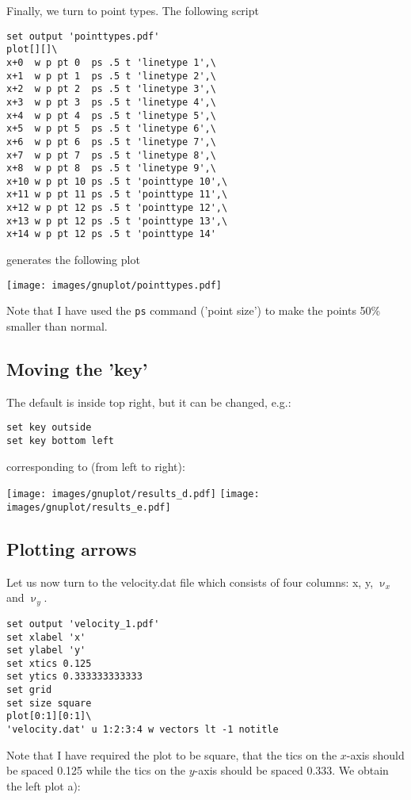 Finally, we turn to point types.
The following script
\begin{verbatim}
set output 'pointtypes.pdf'
plot[][]\
x+0  w p pt 0  ps .5 t 'linetype 1',\
x+1  w p pt 1  ps .5 t 'linetype 2',\
x+2  w p pt 2  ps .5 t 'linetype 3',\
x+3  w p pt 3  ps .5 t 'linetype 4',\
x+4  w p pt 4  ps .5 t 'linetype 5',\
x+5  w p pt 5  ps .5 t 'linetype 6',\
x+6  w p pt 6  ps .5 t 'linetype 7',\
x+7  w p pt 7  ps .5 t 'linetype 8',\
x+8  w p pt 8  ps .5 t 'linetype 9',\
x+10 w p pt 10 ps .5 t 'pointtype 10',\
x+11 w p pt 11 ps .5 t 'pointtype 11',\
x+12 w p pt 12 ps .5 t 'pointtype 12',\
x+13 w p pt 12 ps .5 t 'pointtype 13',\
x+14 w p pt 12 ps .5 t 'pointtype 14' 
\end{verbatim}
generates the following plot
\begin{center}
\texttt{[image: images/gnuplot/pointtypes.pdf]}
\end{center}
Note that I have used the {\tt ps} command ('point size') to make the points 50\% smaller 
than normal. 


\subsection*{Moving the 'key'}

The default is inside top right, but it can be changed, e.g.:
\begin{verbatim}
set key outside
set key bottom left
\end{verbatim}
corresponding to (from left to right):
\begin{center}
\texttt{[image: images/gnuplot/results\_d.pdf]}
\texttt{[image: images/gnuplot/results\_e.pdf]}
\end{center}

\subsection*{Plotting arrows}

Let us now turn to the {\filenamefont velocity.dat} file which consists of 
four columns: x, y, $\upnu_x$ and $\upnu_y$.

\begin{verbatim}
set output 'velocity_1.pdf'
set xlabel 'x' 
set ylabel 'y' 
set xtics 0.125
set ytics 0.333333333333
set grid
set size square
plot[0:1][0:1]\
'velocity.dat' u 1:2:3:4 w vectors lt -1 notitle 
\end{verbatim}
Note that I have required the plot to be square, that the tics on the 
$x$-axis should be spaced 0.125 while the tics on the $y$-axis should be 
spaced 0.333. 
We obtain the left plot a): 

